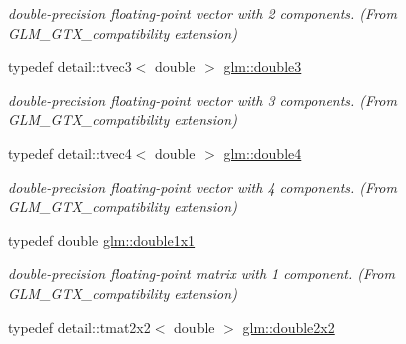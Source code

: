 \begin{DoxyCompactItemize}
\begin{DoxyCompactList}\small\item\em double-\/precision floating-\/point vector with 2 components. (From G\+L\+M\+\_\+\+G\+T\+X\+\_\+compatibility extension) \end{DoxyCompactList}\item 
\hypertarget{group__gtx__compatibility_ga069f773ee9f9f8f204f0dd741cf6b9a2}{}typedef detail\+::tvec3$<$ double $>$ \hyperlink{group__gtx__compatibility_ga069f773ee9f9f8f204f0dd741cf6b9a2}{glm\+::double3}\label{group__gtx__compatibility_ga069f773ee9f9f8f204f0dd741cf6b9a2}

\begin{DoxyCompactList}\small\item\em double-\/precision floating-\/point vector with 3 components. (From G\+L\+M\+\_\+\+G\+T\+X\+\_\+compatibility extension) \end{DoxyCompactList}\item 
\hypertarget{group__gtx__compatibility_gae4d660698c7f8a5dcb6d91bda102f3e6}{}typedef detail\+::tvec4$<$ double $>$ \hyperlink{group__gtx__compatibility_gae4d660698c7f8a5dcb6d91bda102f3e6}{glm\+::double4}\label{group__gtx__compatibility_gae4d660698c7f8a5dcb6d91bda102f3e6}

\begin{DoxyCompactList}\small\item\em double-\/precision floating-\/point vector with 4 components. (From G\+L\+M\+\_\+\+G\+T\+X\+\_\+compatibility extension) \end{DoxyCompactList}\item 
\hypertarget{group__gtx__compatibility_ga1c87d3042377335eb050a20ab0ec148a}{}typedef double \hyperlink{group__gtx__compatibility_ga1c87d3042377335eb050a20ab0ec148a}{glm\+::double1x1}\label{group__gtx__compatibility_ga1c87d3042377335eb050a20ab0ec148a}

\begin{DoxyCompactList}\small\item\em double-\/precision floating-\/point matrix with 1 component. (From G\+L\+M\+\_\+\+G\+T\+X\+\_\+compatibility extension) \end{DoxyCompactList}\item 
\hypertarget{group__gtx__compatibility_ga69e152be36a8b9206f764c3b83f474df}{}typedef detail\+::tmat2x2$<$ double $>$ \hyperlink{group__gtx__compatibility_ga69e152be36a8b9206f764c3b83f474df}{glm\+::double2x2}\label{group__gtx__compatibility_ga69e152be36a8b9206f764c3b83f474df}


\end{DoxyCompactItemize}
